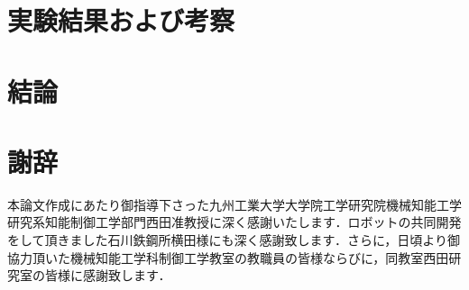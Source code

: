 \documentclass[a4paper,12pt]{jarticle}
\begin{document}
\section{実験結果および考察} \label{result}

\newpage
\section{結論} \label{conclusion}

\section*{謝辞} \label{thanks}
\par 本論文作成にあたり御指導下さった九州工業大学大学院工学研究院機械知能工学研究系知能制御工学部門西田准教授に深く感謝いたします．ロボットの共同開発をして頂きました石川鉄鋼所横田様にも深く感謝致します．さらに，日頃より御協力頂いた機械知能工学科制御工学教室の教職員の皆様ならびに，同教室西田研究室の皆様に感謝致します．
\end{document}
